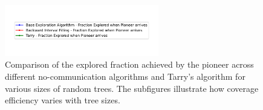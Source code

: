 \begin{figure}[H]
    \centering
    \qquad
    \qquad
    \includegraphics[width=0.6\textwidth]{Cap3/no_comm_fraction_legend.pdf}
    \newline
    \qquad
    \newline
    \qquad
    \caption{Comparison of the explored fraction achieved by the pioneer across different no-communication algorithms and Tarry's algorithm for various sizes of random trees. The subfigures illustrate how coverage efficiency varies with tree sizes.}
    \label{fig_no_comm_fraction_all_sizes_tree}
\end{figure}

